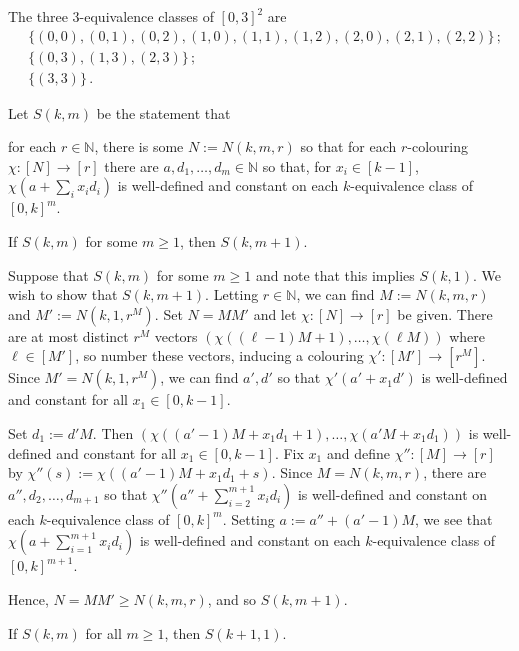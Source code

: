 \documentclass[a4paper]{article}
\let\oldendproof\endproof
\renewenvironment{proof}[1][\proofname]{%
  \oldproof[\scshape \noindent {\bfseries \text{Proof}}]%
}{\oldendproof}
\newcommand{\example} {\bigskip\noindent{\bf Example.}\;\;}
\newcommand{\lemma}{\bigskip\noindent{\bf Lemma.}\;\;}
\newcommand{\fix} {\begin{picture}(0,0)(0,0)\put(-50,0){\huge Fix!}\end{picture}}
\begin{document}
\example
The three $3$-equivalence classes of $[0,3]^2$ are
\begin{align*}
	&\{(0,0), (0,1), (0,2), (1,0), (1,1), (1,2), (2,0), (2,1), (2,2)\}\,;\\
	&\{(0,3), (1,3), (2,3)\}\,;\\
	&\{(3,3)\}\,.
\end{align*}

%
%
\noindent
Let $S(k,m)$ be the statement that
\begin{center}
\begin{minipage}{.9\textwidth}
for each $r \in \mathbb{N}$,
there is some $N:= N(k,m,r)$ so that for each $r$-colouring $\chi: [N] \to [r]$
there are $a, d_1, \ldots, d_m \in \mathbb{N}$ so that,
for $x_i \in [k-1]$,
$\chi(a + \sum_i x_i d_i)$ is well-defined and constant on each $k$-equivalence class of $[0,k]^m$.
\end{minipage}
\end{center}

\lemma
If $S(k,m)$ for some $m \geq 1$, then $S(k, m+1)$.

\begin{proof}
Suppose that $S(k,m)$ for some $m \geq 1$ and note that this implies $S(k,1)$.
We wish to show that $S(k, m+1)$.
Letting $r \in \mathbb{N}$, we can find $M:= N(k,m,r)$ and $M':= N(k,1,r^M)$.
Set $N = MM'$ and let $\chi : [N] \to [r]$ be given.
There are at most distinct $r^M$ vectors $(\chi((\ell-1)M+1), \ldots, \chi(\ell M))$
where $\ell \in [M']$, so number these vectors,
inducing a colouring $\chi' : [M'] \to [r^M]$.
Since $M' = N(k,1,r^M)$, we can find $a', d'$ so that
$\chi'(a' + x_1 d')$ is well-defined and constant for all $x_1 \in [0,k-1]$.

Set $d_1 := d' M$.
Then $(\chi((a'-1)M + x_1 d_1 + 1), \ldots, \chi(a' M + x_1 d_1))$ is
well-defined and constant for all $x_1 \in [0,k-1]$.
Fix $x_1$ and define $\chi'' : [M] \to [r]$ by $\chi''(s):=\chi((a'-1)M + x_1 d_1 + s)$.
Since $M = N(k,m,r)$, there are $a'', d_2, \ldots, d_{m+1}$ so that
$\chi'' (a'' + \sum_{i=2}^{m+1} x_i d_i)$ is well-defined and
constant on each $k$-equivalence class of $[0,k]^m$.
Setting $a:= a'' + (a'-1)M$,
we see that $\chi(a + \sum_{i=1}^{m+1} x_i d_i)$ is well-defined
and constant on each $k$-equivalence class of $[0,k]^{m+1}$.

Hence, $N = MM' \geq N(k,m,r)$, and so $S(k,m+1)$.
\end{proof}

\lemma
If $S(k,m)$ for all $m \geq 1$, then $S(k+1,1)$.
\end{document}
